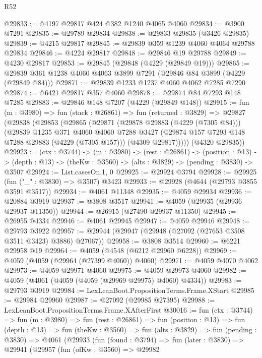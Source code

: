 \begin{lexlean}{R52}
\begin{coremodule}
@29833 := @4197 @29817 @424 @382 @1240 @4065 @4060
@29834 := @3900 @7291
@29835 := @29789 @29834
@29838 := @29833 @29835 (@3426 @29835)
@29839 := @4215 @29817
@29845 := @29839 @359 @1239 @4060 @4064 @29788 @29834
@29846 := @4224 @29817
@29848 := @29846 @19 @29788
@29849 := @4230 @29817
@29853 := @29845 (@29848 (@4229 (@29849 @19)))
@29865 := @29839 @361 @1238 @4060 @4063 @3899 @7291 (@29846 @84 @3899 (@4229 (@29849 @84)))
@29871 := @29839 @1233 @1237 @4060 @4062 @7285 @7290
@29874 := @6421 @29817 @357 @4060
@29878 := @29874 @84 @7293 @148 @7285
@29883 := @29846 @148 @7207 (@4229 (@29849 @148))
@29915 := fun (m : @3980) =>
  fun (stack : @26861) =>
  fun (returned : @3829) =>
  @29827
    (@29838
      (@29853
        (@29865
          (@29871
            (@29878 @29883 (@4229 (@7305 @84)))
            (@29839
              @1235
              @371
              @4060
              @4060
              @7288
              @3427
              (@29874 @157 @7293 @148 @7288 @29883 (@4229 (@7305 @157)))
              (@4309 @29817)))))
      (@4320 @29835))
@29923 := (ctx : @3744) ->
  (m : @3980) ->
  (rest : @26861) ->
  (position : @13) ->
  (depth : @13) -> (theKw : @3560) -> (alts : @3829) -> (pending : @3830) -> @3507
@29924 := List.casesOn.{1, 0}
@29925 := @29924 @3794
@29928 := @29925 (fun ("_" : @3830) => @3507) @3423
@29933 := @29928 (@4644 (@29793 @3855 @3591 @3517))
@29934 := @4061 @11348
@29935 := @4059 @29934
@29936 := @20884 @3919
@29937 := @3808 @3517
@29941 := @4059 (@29935 (@29936 @29937 @11350))
@29944 := @26915 (@27490 @29937 @11350)
@29945 := @26955 @4334
@29946 := @4061 @29945
@29947 := @4059 @29946
@29948 := @29793 @3922
@29957 := @29944 (@29947 (@29948 (@27092 (@27653 @3508 @3511 @3423) @3886) @27067))
@29958 := @3808 @3514
@29960 := @6221 @29958 @19
@29964 := @4059 (@4548 (@6212 @29960 @6228))
@29969 := @4059 (@4059 (@29964 (@27399 @4060)) @4060)
@29971 := @4059 @4070 @4062
@29973 := @4059 @29971 @4060
@29975 := @4059 @29973 @4060
@29982 := @4059 (@4061 (@4059 (@4059 (@29969 @29975) @4060) @4334))
@29983 := @29793 @3919
@29984 := LexLeanBoot.PropositionTerms.Frame.XStart
@29985 := @29984 @29960
@29987 := @27092 (@29985 @27395)
@29988 := LexLeanBoot.PropositionTerms.Frame.XAfterFirst
@30016 := fun (ctx : @3744) =>
  fun (m : @3980) =>
  fun (rest : @26861) =>
  fun (position : @13) =>
  fun (depth : @13) =>
  fun (theKw : @3560) =>
  fun (alts : @3829) =>
  fun (pending : @3830) =>
  @4061
    (@29933
      (fun (found : @3794) =>
      fun (later : @3830) =>
      @29941
        (@29957
          (fun (ofKw : @3560) =>
          @29982

\end{coremodule}
\end{lexlean}
